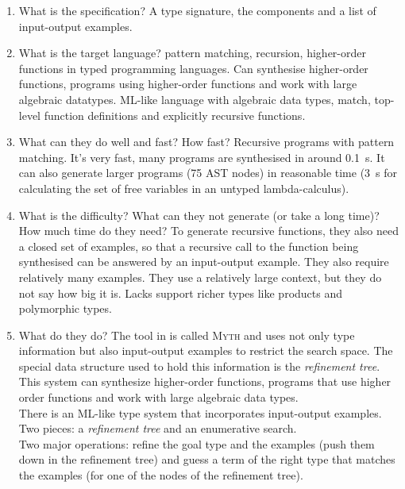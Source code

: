 \begin{enumerate}
\item What is the specification?
A type signature, the components and a list of input-output examples.
\item What is the target language?
pattern matching, recursion, higher-order functions in typed programming languages. Can synthesise higher-order functions, programs using higher-order functions and work with large algebraic datatypes.
ML-like language with algebraic data types, match, top-level function definitions and explicitly recursive functions.
\item What can they do well and fast? How fast?
Recursive programs with pattern matching. It's very fast, many programs are synthesised in around 0.1~s. It can also generate larger programs (75 AST nodes) in reasonable time (3~s for calculating the set of free variables in an untyped lambda-calculus).
\item What is the difficulty? What can they not generate (or take a long time)? How much time do they need?
To generate recursive functions, they also need a closed set of examples, so that a recursive call to the function being synthesised can be answered by an input-output example. They also require relatively many examples. They use a relatively large context, but they do not say how big it is.
Lacks support richer types like products and polymorphic types.
\item What do they do?
The tool in \cite{MythPaper} is called \textsc{Myth} and uses not only type information but also input-output examples to restrict the search space. The special data structure used to hold this information is the \emph{refinement tree}. This system can synthesize higher-order functions, programs that use higher order functions and work with large algebraic data types.\\
There is an ML-like type system that incorporates input-output examples. Two pieces: a \emph{refinement tree} and an enumerative search.\\
Two major operations: refine the goal type and the examples (push them down in the refinement tree) and guess a term of the right type that matches the examples (for one of the nodes of the refinement tree).\\
\end{enumerate}






